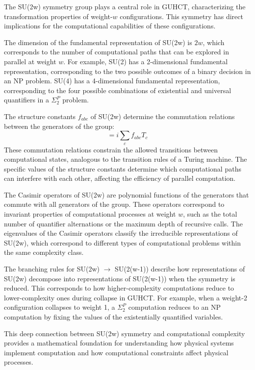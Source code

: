 \documentclass[11pt,a4paper]{article}
\makeatletter
\renewenvironment{proof}[1][\proofname]{\par
  \pushQED{\qed}%
  \normalfont \topsep6\p@\@plus6\p@\relax
  \trivlist
  \item[\hskip\labelsep
        \itshape
    #1\@addpunct{.}]\ignorespaces
}{%
  \popQED\endtrivlist\@endpefalse
}
\makeatother
\begin{document}
\begin{proof}
The SU(2w) symmetry group plays a central role in GUHCT, characterizing the transformation properties of weight-$w$ configurations. This symmetry has direct implications for the computational capabilities of these configurations.

The dimension of the fundamental representation of SU(2w) is $2w$, which corresponds to the number of computational paths that can be explored in parallel at weight $w$. For example, SU(2) has a 2-dimensional fundamental representation, corresponding to the two possible outcomes of a binary decision in an NP problem. SU(4) has a 4-dimensional fundamental representation, corresponding to the four possible combinations of existential and universal quantifiers in a $\Sigma_2^P$ problem.

The structure constants $f_{abc}$ of SU(2w) determine the commutation relations between the generators of the group:
\begin{equation}
[T_a, T_b] = i \sum_c f_{abc} T_c
\end{equation}
These commutation relations constrain the allowed transitions between computational states, analogous to the transition rules of a Turing machine. The specific values of the structure constants determine which computational paths can interfere with each other, affecting the efficiency of parallel computation.

The Casimir operators of SU(2w) are polynomial functions of the generators that commute with all generators of the group. These operators correspond to invariant properties of computational processes at weight $w$, such as the total number of quantifier alternations or the maximum depth of recursive calls. The eigenvalues of the Casimir operators classify the irreducible representations of SU(2w), which correspond to different types of computational problems within the same complexity class.

The branching rules for SU(2w) $\rightarrow$ SU(2(w-1)) describe how representations of SU(2w) decompose into representations of SU(2(w-1)) when the symmetry is reduced. This corresponds to how higher-complexity computations reduce to lower-complexity ones during collapse in GUHCT. For example, when a weight-2 configuration collapses to weight 1, a $\Sigma_2^P$ computation reduces to an NP computation by fixing the values of the existentially quantified variables.

This deep connection between SU(2w) symmetry and computational complexity provides a mathematical foundation for understanding how physical systems implement computation and how computational constraints affect physical processes.
\end{proof}
\end{document}
